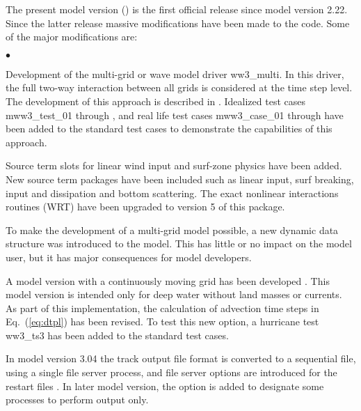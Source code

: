 \vspace{\baselineskip} \pb \noindent The present model version (\WWver) is the
first official release since model version 2.22. Since the latter release
massive modifications have been made to the code.  Some of the major
modifications are:

\begin{list}{$\bullet$}{\rightmargin 5mm \parsep 0mm \itemsep 0mm}

\item
Development of the multi-grid or wave model driver {\file ww3\_multi}. In this
driver, the full two-way interaction between all grids is considered at the
time step level. The development of this approach is described in
\cite{tol:MMAB07b, tol:OMOD08b}. Idealized test cases {\file mww3\_test\_01}
through {}, and real life test cases {\file mww3\_case\_01} through
{} have been added to the standard test cases to demonstrate the
capabilities of this approach.

\item
Source term slots for linear wind input and surf-zone physics have been added.
New source term packages have been included such as linear input, surf
breaking, \wam{} input and dissipation and bottom scattering. The exact
nonlinear interactions routines (WRT) have been upgraded to version 5 of
this package.

\item
To make the development of a multi-grid model possible, a new dynamic data
structure was introduced to the model. This has little or no impact on the
model user, but it has major consequences for model developers.

\item
A model version with a continuously moving grid has been developed
\citep[model version 3.02,][]{tol:OMOD05b}. This model version is intended
only for deep water without land masses or currents. As part of this
implementation, the calculation of advection time steps in Eq.~(\ref{eq:dtpl})
has been revised. To test this new option, a hurricane test {\file ww3\_ts3}
has been added to the standard test cases.

\item
In model version 3.04 the track output file format is converted to a
sequential file, using a single file server process, and file server options
are introduced for the restart files \citep{tol:MMAB03b}. In later model
version, the option is added to designate some processes to perform output
only.


\end{list}
